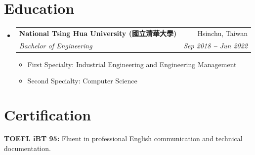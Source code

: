 \documentclass[letterpaper,11pt]{article}
\makeatletter
\newcommand{\resumeItem}[1]{
  \item\small{
    {#1 \vspace{-2pt}}
  }
}
\newcommand{\resumeSubheading}[4]{
  \vspace{-2pt}\item
    \begin{tabular*}{0.97\textwidth}[t]{l@{\extracolsep{\fill}}r}
      \textbf{#1} & #2 \\
      \textit{\small#3} & \textit{\small #4} \\
    \end{tabular*}\vspace{-7pt}
}
\newcommand{\resumeSubHeadingListStart}{\begin{itemize}[leftmargin=0.15in, label={}]}
\newcommand{\resumeSubHeadingListEnd}{\end{itemize}}
\newcommand{\resumeItemListStart}{\begin{itemize}}
\newcommand{\resumeItemListEnd}{\end{itemize}\vspace{-5pt}}
\makeatother
\begin{document}
\section{Education}
  \resumeSubHeadingListStart
    \resumeSubheading
      {National Tsing Hua University (國立清華大學)}{Hsinchu, Taiwan}
      {Bachelor of Engineering}{Sep 2018 \textbf{--} Jun 2022}
      \resumeItemListStart
        \resumeItem{First Specialty: Industrial Engineering and Engineering Management}
        \resumeItem{Second Specialty: Computer Science}
      \resumeItemListEnd
  \resumeSubHeadingListEnd

\section{Certification}
  \resumeSubHeadingListStart
    \small{\item{
        \textbf{TOEFL iBT 95:}{ Fluent in professional English communication and technical documentation.}
    }}
  \resumeSubHeadingListEnd

\end{document}
